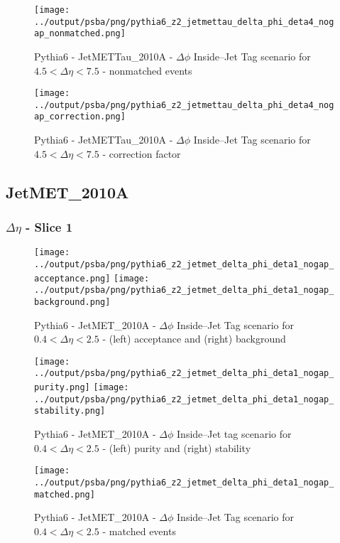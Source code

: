 \documentclass[11pt]{book}
\begin{document}
\begin{figure}[ht]
\centering
\texttt{[image: ../output/psba/png/pythia6\_z2\_jetmettau\_delta\_phi\_deta4\_nogap\_nonmatched.png]}
\caption{Pythia6 - JetMETTau\_2010A - $\Delta\phi$ Inside--Jet Tag scenario for $4.5 < \Delta\eta < 7.5$ - nonmatched events}
\label{fig:p6_jetmettau_delta_phi_deta4_nogap_nonmatched}
\end{figure}

\begin{figure}[ht]
\centering
\texttt{[image: ../output/psba/png/pythia6\_z2\_jetmettau\_delta\_phi\_deta4\_nogap\_correction.png]}
\caption{Pythia6 - JetMETTau\_2010A - $\Delta\phi$ Inside--Jet Tag scenario for $4.5 < \Delta\eta < 7.5$ - correction factor}
\label{fig:p6_jetmettau_delta_phi_deta4_nogap_correction}
\end{figure}


\clearpage
\subsection{JetMET\_2010A}

\subsubsection{$\Delta\eta$ - Slice 1}
\begin{figure}[ht]
\centering
\texttt{[image: ../output/psba/png/pythia6\_z2\_jetmet\_delta\_phi\_deta1\_nogap\_acceptance.png]}
\texttt{[image: ../output/psba/png/pythia6\_z2\_jetmet\_delta\_phi\_deta1\_nogap\_background.png]}
\caption{Pythia6 - JetMET\_2010A - $\Delta\phi$ Inside--Jet Tag scenario for $0.4 < \Delta\eta < 2.5$ - (left) acceptance and (right) background}
\label{fig:p6_jetmet_delta_phi_deta1_nogap_ab}
\end{figure}

\begin{figure}[ht]
\centering
\texttt{[image: ../output/psba/png/pythia6\_z2\_jetmet\_delta\_phi\_deta1\_nogap\_purity.png]}
\texttt{[image: ../output/psba/png/pythia6\_z2\_jetmet\_delta\_phi\_deta1\_nogap\_stability.png]}
\caption{Pythia6 - JetMET\_2010A - $\Delta\phi$ Inside--Jet tag scenario for $0.4 < \Delta\eta < 2.5$ - (left) purity and (right) stability}
\label{fig:p6_jetmet_delta_phi_deta1_nogap_ps}
\end{figure}

\begin{figure}[ht]
\centering
\texttt{[image: ../output/psba/png/pythia6\_z2\_jetmet\_delta\_phi\_deta1\_nogap\_matched.png]}
\caption{Pythia6 - JetMET\_2010A - $\Delta\phi$ Inside--Jet Tag scenario for $0.4 < \Delta\eta < 2.5$ - matched events}
\label{fig:p6_jetmet_delta_phi_deta1_nogap_matched}
\end{figure}
\end{document}
